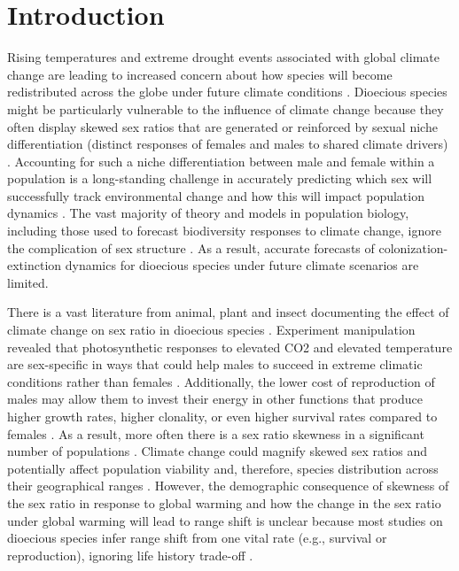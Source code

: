 \documentclass[11pt]{article}
\begin{document}
\section*{Introduction}
Rising temperatures and extreme drought events associated with global climate change are leading to increased concern about how species will become redistributed across the globe under future climate conditions \citep{bertrand2011changes,gamelon2017interactions}.
Dioecious species might be particularly vulnerable to the influence of climate change because they often display skewed sex ratios that are generated or reinforced by sexual niche differentiation (distinct responses of females and males to shared climate drivers) \citep{Tognetti2012}. 
Accounting for such a niche differentiation between male and female within a population is a long-standing challenge in accurately predicting which sex will successfully track environmental change and how this will impact population dynamics \citep{jones1999sex,gissi2023exploring}. 
The vast majority of theory and models in population biology, including those used to forecast biodiversity responses to climate change, ignore the complication of sex structure \citep{pottier2021sexual,ellis2017does}.
As a result, accurate forecasts of colonization-extinction dynamics for dioecious species under future climate scenarios are limited. 

There is a vast literature from animal, plant and insect documenting the effect of climate change on sex ratio in dioecious species \citep{gissi2023exploring,gissi2023sex}. 
Experiment manipulation revealed that photosynthetic responses to elevated CO2 and elevated temperature are sex-specific in ways that could help males to succeed in extreme climatic conditions rather than females \citep{zhao2012sex, burli2022environmental}.
Additionally, the lower cost of reproduction of males may allow them to invest their energy in other functions that produce higher growth rates, higher clonality, or even higher survival rates compared to females \citep{cipollini1994sexual, bruijning2017surviving}.
As a result, more often there is a sex ratio skewness in a significant number of populations \citep{hultine2016climate}. 
Climate change could magnify skewed sex ratios and potentially affect population viability and, therefore, species distribution across their geographical ranges \citep{davis2001range, pease1989model}. 
However, the demographic consequence of skewness of the sex ratio in response to global warming and how the change in the sex ratio under global warming will lead to range shift is unclear because most studies on dioecious species infer range shift from one vital rate (e.g., survival or reproduction), ignoring life history trade-off \citep{gianuca2019sex, petry2016sex}.
\end{document}
